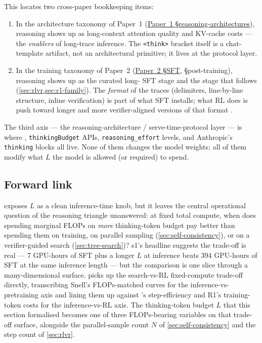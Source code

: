 This locates two cross-paper bookkeeping items:
\begin{enumerate}
  \item In the architecture taxonomy of Paper~1
        (\hyperref[P1-sec:frontier-snapshot]{Paper~1 §reasoning-architectures}), reasoning shows up as
        long-context attention quality and KV-cache costs --- the
        \emph{enablers} of long-trace inference. The
        \texttt{<think>} bracket itself is a chat-template artifact,
        not an architectural primitive; it lives at the
        protocol layer.
  \item In the training taxonomy of Paper~2 (\hyperref[P2-sec:sft]{Paper~2 §SFT},
        §post-training), reasoning shows up as the curated long-
        SFT stage and the  stage that follows
        (\cref{sec:rlvr,sec:r1-family}). The \emph{format} of the
        traces (delimiters, line-by-line structure, inline
        verification) is part of what SFT installs; what RL does is
        push toward longer and more verifier-aligned versions of that
        format \citep[\S 2.2.2]{deepseek-r1}.
\end{enumerate}
The third axis --- the reasoning-architecture / serve-time-protocol
layer --- is where , \texttt{thinkingBudget} APIs,
\texttt{reasoning\_effort} levels, and Anthropic's \texttt{thinking}
blocks all live. None of them changes the model weights; all of them
modify what $L$ the model is allowed (or required) to spend.

\subsection{Forward link}
\label{sec:bf-forward}

 exposes $L$ as a clean inference-time knob, but it
leaves the central operational question of the reasoning triangle
unanswered: at fixed total compute, when does spending marginal FLOPs
on \emph{more} thinking-token budget pay better than spending them on
 training, on parallel sampling (\cref{sec:self-consistency}), or
on a verifier-guided search (\cref{sec:tree-search})? s1's headline
suggests the trade-off is real --- 7 GPU-hours of SFT plus a longer
$L$ at inference beats 394 GPU-hours of SFT at the same inference
length \citep[\S 5.1]{s1-2025} --- but the comparison is one slice
through a many-dimensional surface.  picks up
the search-vs-RL fixed-compute trade-off directly, transcribing
Snell's FLOPs-matched curves \citep[\S 6]{snell2024} for the
inference-vs-pretraining axis and lining them up against
's step-efficiency and R1's training-token costs for the
inference-vs-RL axis. The thinking-token budget $L$ that this section
formalised becomes one of three FLOPs-bearing variables on that
trade-off surface, alongside the parallel-sample count $N$ of
\cref{sec:self-consistency} and the  step count of
\cref{sec:rlvr}.
